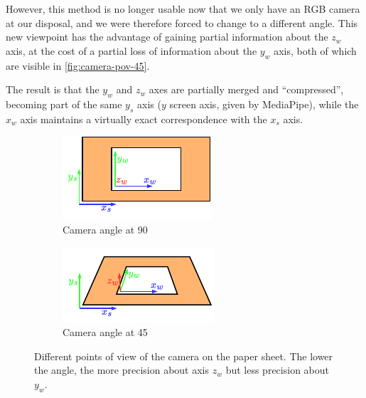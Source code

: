 However, this method is no longer usable now that we only have an RGB camera at our disposal,
and we were therefore forced to change to a different angle.
This new viewpoint has the advantage of gaining partial information about the $z_w$ axis, at the cost of a partial
loss of information about the $y_w$ axis, both of which are visible in \autoref{fig:camera-pov-45}.

The result is that the $y_w$ and $z_w$ axes are partially merged and ``compressed'', becoming part of the same
$y_s$ axis ($y$ screen axis, given by MediaPipe), while the $x_w$ axis
maintains a virtually exact correspondence with the $x_s$ axis.

\begin{figure}[ht]
	\centering
	\begin{subfigure}{0.49\textwidth}
		\centering
		\includegraphics[width=\textwidth]{images/application/camera-pov-90}
		\caption{Camera angle at 90\degree}
		\label{fig:camera-pov-90}
	\end{subfigure}
	\hfill
	\begin{subfigure}{0.49\textwidth}
		\centering
		\includegraphics[width=\textwidth]{images/application/camera-pov-45}
		\caption{Camera angle at 45\degree}
		\label{fig:camera-pov-45}
	\end{subfigure}
	\caption{
		Different points of view of the camera on the paper sheet.
		The lower the angle, the more precision about axis $z_w$ but less precision about $y_w$.
	}
	\label{fig:camera-povs}
\end{figure}

